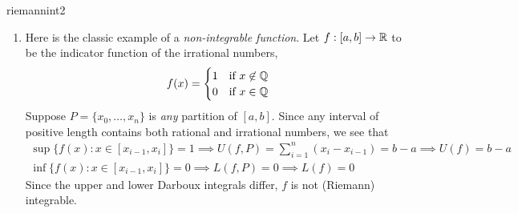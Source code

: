 \begin{examples}{}{riemannint2}
\begin{enumerate}
		\item\label{ex:riemannint2nonint} Here is the classic example of a \emph{non-integrable function}. Let $f:[a,b]\to\mathbb{R}$ to be the indicator function of the irrational numbers,
		\[
			f(x)=
			\begin{cases}
				1&\text{if }x\not\in\mathbb{Q}\\
				0&\text{if }x\in\mathbb{Q}
			\end{cases}
		\]
		Suppose $P=\{x_0,\ldots,x_n\}$ is \emph{any} partition of $[a,b]$. Since any interval of positive length contains both rational and irrational numbers, we see that
		\begin{gather*}
			\sup\bigl\{f(x):x\in[x_{i-1},x_i]\bigr\} =1 \implies U(f,P)=\sum_{i=1}^n(x_i-x_{i-1})=b-a\implies U(f)=b-a\\
			\inf\bigl\{f(x):x\in[x_{i-1},x_i]\bigr\}=0 \implies L(f,P)=0\implies L(f)=0
		\end{gather*}
		Since the upper and lower Darboux integrals differ, $f$ is not (Riemann) integrable.
	\end{enumerate}
\end{examples}


